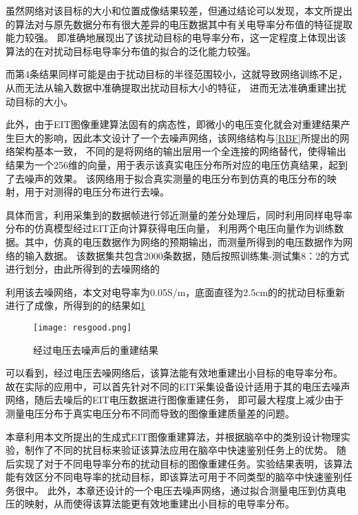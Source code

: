 虽然网络对该目标的大小和位置成像结果较差，但通过结论可以发现，本文所提出的算法对与原先数据分布有很大差异的电压数据其中有关电导率分布值的特征提取能力较强。
即准确地展现出了该扰动目标的电导率分布，这一定程度上体现出该算法的在对扰动目标电导率分布值的拟合的泛化能力较强。

而第4条结果同样可能是由于扰动目标的半径范围较小，这就导致网络训练不足，从而无法从输入数据中准确提取出扰动目标大小的特征，
进而无法准确重建出扰动目标的大小。

此外，由于EIT图像重建算法固有的病态性，即微小的电压变化就会对重建结果产生巨大的影响，因此本文设计了一个去噪声网络，该网络结构与\cref{RBF}所提出的网络架构基本一致，
不同的是将网络的输出层用一个全连接的网络替代，使得输出结果为一个256维的向量，用于表示该真实电压分布所对应的电压仿真结果，起到了去噪声的效果。
该网络用于拟合真实测量的电压分布到仿真的电压分布的映射，用于对测得的电压分布进行去噪。

具体而言，利用采集到的数据帧进行邻近测量的差分处理后，同时利用同样电导率分布的仿真模型经过EIT正向计算获得电压向量，
利用两个电压向量作为训练数据。其中，仿真的电压数据作为网络的预期输出，而测量所得到的电压数据作为网络的输入数据。
该数据集共包含2000条数据，随后按照训练集-测试集8：2的方式进行划分，由此所得到的去噪网络的

利用该去噪网络，本文对电导率为0.05S/m，底面直径为2.5cm的的扰动目标重新进行了成像，所得到的的结果如\cref{figure:resgood}
\begin{figure}[h]
    \centering
    \texttt{[image: resgood.png]}
    \caption{经过电压去噪声后的重建结果}
    \label{figure:resgood}
\end{figure}

可以看到，经过电压去噪网络后，该算法能有效地重建出小目标的电导率分布。
故在实际的应用中，可以首先针对不同的EIT采集设备设计适用于其的电压去噪声网络，随后去噪后的EIT电压数据进行图像重建任务，
即可最大程度上减少由于测量电压分布于真实电压分布不同而导致的图像重建质量差的问题。


本章利用本文所提出的生成式EIT图像重建算法，并根据脑卒中的类别设计物理实验，制作了不同的扰目标来验证该算法应用在脑卒中快速鉴别任务上的优势。
随后实现了对于不同电导率分布的扰动目标的图像重建任务。实验结果表明，该算法能有效区分不同电导率的扰动目标，即该算法可用于不同类型的脑卒中快速鉴别任务很中。
此外，本章还设计的一个电压去噪声网络，通过拟合测量电压到仿真电压的映射，从而使得该算法能更有效地重建出小目标的电导率分布。
